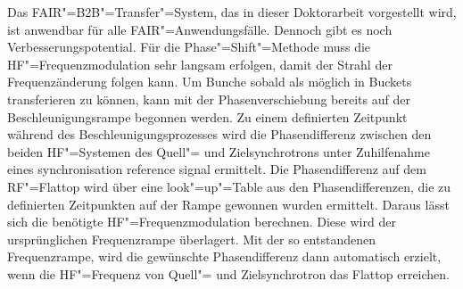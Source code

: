 Das FAIR"=B2B"=Transfer"=System, das in dieser Doktorarbeit vorgestellt wird, ist anwendbar f\"ur alle FAIR"=Anwendungsf\"alle. Dennoch gibt es noch Verbesserungspotential. F\"ur die Phase"=Shift"=Methode muss die HF"=Frequenzmodulation sehr langsam erfolgen, damit der Strahl der Frequenz\"anderung folgen kann. Um Bunche sobald als m\"oglich in Buckets transferieren zu k\"onnen, kann mit der Phasenverschiebung bereits auf der Beschleunigungsrampe begonnen werden. Zu einem definierten Zeitpunkt w\"ahrend des Beschleunigungsprozesses wird die Phasendifferenz zwischen den beiden HF"=Systemen des Quell"= und Zielsynchrotrons unter Zuhilfenahme eines synchronisation reference signal ermittelt. Die Phasendifferenz auf dem RF"=Flattop wird \"uber eine look"=up"=Table aus den Phasendifferenzen, die zu definierten Zeitpunkten auf der Rampe gewonnen wurden ermittelt. Daraus l\"asst sich die ben\"otigte HF"=Frequenzmodulation berechnen. Diese wird der urspr\"unglichen Frequenzrampe \"uberlagert. Mit der so entstandenen Frequenzrampe, wird die gew\"unschte Phasendifferenz dann automatisch erzielt, wenn die HF"=Frequenz von Quell"= und Zielsynchrotron das Flattop erreichen.